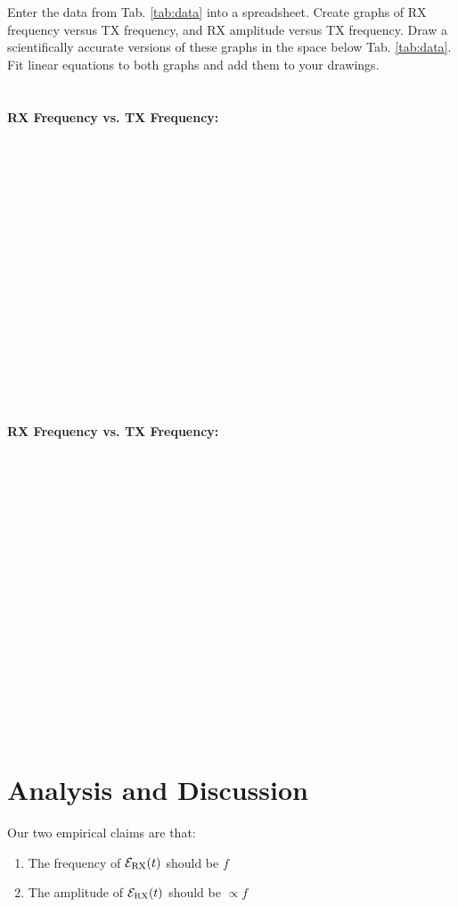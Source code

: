 \documentclass[12pt,twocolumn]{article}
\begin{document}
Enter the data from Tab. \ref{tab:data} into a spreadsheet.  Create graphs of RX frequency versus TX frequency, and RX amplitude versus TX frequency.  Draw a scientifically accurate versions of these graphs in the space below Tab. \ref{tab:data}.  Fit linear equations to both graphs and add them to your drawings. \\ \\ \\
\noindent
\textbf{RX Frequency vs. TX Frequency:} \\ \\ \\ \\ \\ \\ \\ \\ \\ \\ \\ \\ \\ \\ \\ \\ \\ \\
\noindent
\textbf{RX Frequency vs. TX Frequency:} \\ \\ \\ \\ \\ \\ \\ \\ \\ \\ \\ \\ \\ \\ \\ \\ \\ \\

\section{Analysis and Discussion}

Our two empirical claims are that:

\begin{enumerate}
\item The frequency of $\mathcal{E}_{\rm RX}(t)$ should be $f$
\item The amplitude of $\mathcal{E_{\rm RX}}(t)$ should be $\propto f$
\end{enumerate}
\end{document}
